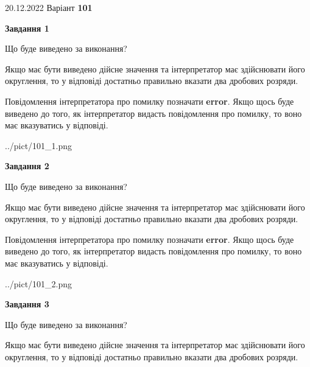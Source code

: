 \documentclass[12pt, ukrainian]{article}
\begin{document}
{20.12.2022 Варіант \No \textbf { 101 }\par}
{
\begin {Large}

{\begin {center}\textbf{Завдання 1}\end {center}}\par
Що буде виведено за виконання? \par

Якщо має бути виведено дійсне значення та інтерпретатор має здійснювати його округлення, 
то у відповіді достатньо правильно вказати два дробових розряди.

Повідомлення інтерпретатора про помилку позначати \textbf{error}.
Якщо щось буде виведено до того, як інтерпретатор видасть повідомлення про помилку, 
то воно має вказуватись у відповіді. \par

\begin{center}
	{../pict/101_1.png}
\end{center}
\newpage

{\begin {center}\textbf{Завдання 2}\end {center}}\par
Що буде виведено за виконання? \par

Якщо має бути виведено дійсне значення та інтерпретатор має здійснювати його округлення, 
то у відповіді достатньо правильно вказати два дробових розряди.

Повідомлення інтерпретатора про помилку позначати \textbf{error}.
Якщо щось буде виведено до того, як інтерпретатор видасть повідомлення про помилку, 
то воно має вказуватись у відповіді. \par

\begin{center}
	{../pict/101_2.png}
\end{center}
\newpage

{\begin {center}\textbf{Завдання 3}\end {center}}\par
Що буде виведено за виконання? \par

Якщо має бути виведено дійсне значення та інтерпретатор має здійснювати його округлення, 
то у відповіді достатньо правильно вказати два дробових розряди.


\end{Large}}
\end{document}

